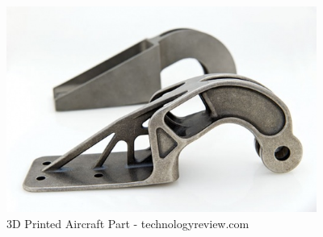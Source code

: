\begin{figure}[H]
\centering
        \includegraphics[width=4.0in]  {Images/print-aircraft.jpg}
        \caption{3D Printed Aircraft Part - technologyreview.com}
        \label{3D Printed Aircraft part}
\end{figure}

